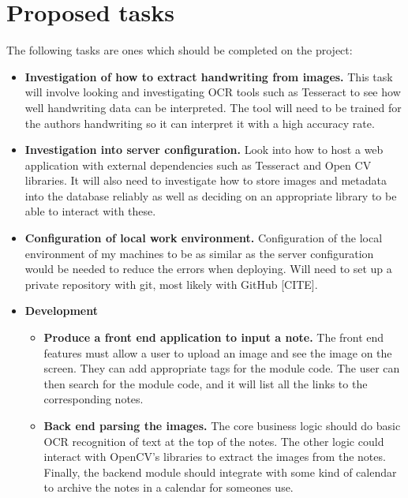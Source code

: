 \documentclass[11pt,fleqn,twoside]{article}
\begin{document}
\section{Proposed tasks}
The following tasks are ones which should be completed on the project:
\begin{itemize}

\item \textbf{Investigation of how to extract handwriting from images.} This task will involve looking and investigating OCR tools such as Tesseract to see how well handwriting data can be interpreted. The tool will need to be trained for the authors handwriting so it can interpret it with a high accuracy rate.

\item \textbf{Investigation into server configuration.} Look into how to host a web application with external dependencies such as Tesseract and Open CV libraries. It will also need to investigate how to store images and metadata into the database reliably as well as deciding on an appropriate library to be able to interact with these.

\item \textbf{Configuration of local work environment.} Configuration of the local environment of my machines to be as similar as the server configuration would be needed to reduce the errors when deploying. Will need to set up a private repository with git, most likely with GitHub [CITE].

\item \textbf{Development}
  \begin{itemize}

    \item \textbf{Produce a front end application to input a note.} The front end features must allow a user to upload an image and see the image on the screen. They can add appropriate tags for the module code. The user can then search for the module code, and it will list all the links to the corresponding notes.

    \item \textbf{Back end parsing the images.} The core business logic should do basic OCR recognition of text at the top of the notes. The other logic could interact with OpenCV's libraries to extract the images from the notes. Finally, the backend module should integrate with some kind of calendar to archive the notes in a calendar for someones use.


\end{itemize}
\end{itemize}
\end{document}
